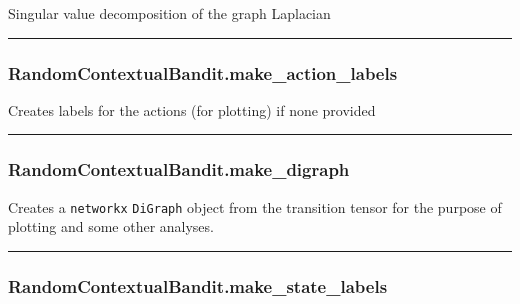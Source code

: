 \begin{Shaded}
\begin{Highlighting}[]
\NormalTok{)}
\end{Highlighting}
\end{Shaded}

Singular value decomposition of the graph Laplacian

\begin{center}\rule{0.5\linewidth}{\linethickness}\end{center}

\subsubsection{RandomContextualBandit.make\_action\_labels}\label{randomcontextualbandit.make_action_labels}

\begin{Shaded}
\begin{Highlighting}[]
\NormalTok{)}
\end{Highlighting}
\end{Shaded}

Creates labels for the actions (for plotting) if none provided

\begin{center}\rule{0.5\linewidth}{\linethickness}\end{center}

\subsubsection{RandomContextualBandit.make\_digraph}\label{randomcontextualbandit.make_digraph}

\begin{Shaded}
\begin{Highlighting}[]
\NormalTok{)}
\end{Highlighting}
\end{Shaded}

Creates a \texttt{networkx} \texttt{DiGraph} object from the transition
tensor for the purpose of plotting and some other analyses.

\begin{center}\rule{0.5\linewidth}{\linethickness}\end{center}

\subsubsection{RandomContextualBandit.make\_state\_labels}\label{randomcontextualbandit.make_state_labels}

